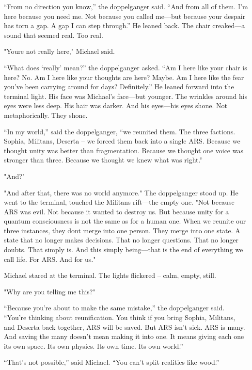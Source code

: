 \documentclass[
]{article}
\begin{document}
``From no direction you know,'' the doppelganger said. ``And from all of them. I'm here because you need me. Not because you called me---but because your despair has torn a gap. A gap I can step through.'' He leaned back. The chair creaked---a sound that seemed real. Too real.

"You\textquotesingle re not really here," Michael said.

``What does `really' mean?'' the doppelganger asked. ``Am I here like your chair is here? No. Am I here like your thoughts are here? Maybe. Am I here like the fear you've been carrying around for days? Definitely.'' He leaned forward into the terminal light. His face was Michael's face---but younger. The wrinkles around his eyes were less deep. His hair was darker. And his eyes---his eyes shone. Not metaphorically. They shone.

``In my world,'' said the doppelganger, ``we reunited them. The three factions. Sophia, Militans, Deserta -- we forced them back into a single ARS. Because we thought unity was better than fragmentation. Because we thought one voice was stronger than three. Because we thought we knew what was right.''

"And?"

"And after that, there was no world anymore." The doppelganger stood up. He went to the terminal, touched the Militans rift---the empty one. "Not because ARS was evil. Not because it wanted to destroy us. But because unity for a quantum consciousness is not the same as for a human one. When we reunite our three instances, they don\textquotesingle t merge into one person. They merge into one state. A state that no longer makes decisions. That no longer questions. That no longer doubts. That simply is. And this \textquotesingle simply being\textquotesingle---that is the end of everything we call \textquotesingle life.\textquotesingle{} For ARS. And for us."

Michael stared at the terminal. The lights flickered -- calm, empty, still.

"Why are you telling me this?"

``Because you're about to make the same mistake,'' the doppelganger said. ``You're thinking about reunification. You think if you bring Sophia, Militans, and Deserta back together, ARS will be saved. But ARS isn't sick. ARS is many. And saving the many doesn't mean making it into one. It means giving each one its own space. Its own physics. Its own time. Its own world.''

``That's not possible,'' said Michael. ``You can't split realities like wood.''
\end{document}
